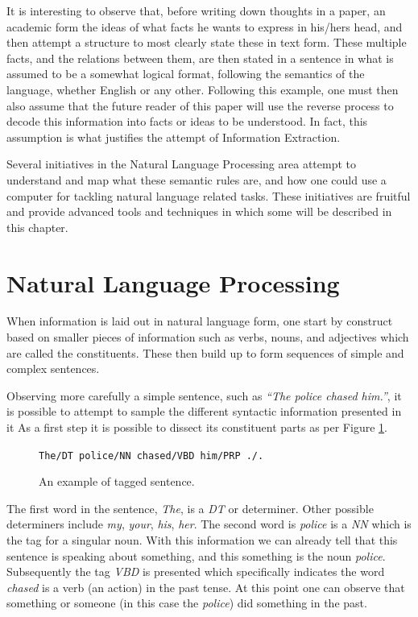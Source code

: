 \documentclass[11pt,a4paper,openright]{memoir}
\begin{document}
It is interesting to observe that, before writing down thoughts in a paper, an academic form the ideas of what facts he wants to express in his/hers head, and then attempt a structure to most clearly state these in text form. These multiple facts, and the relations between them, are then stated in a sentence in what is assumed to be a somewhat logical format, following the semantics of the language, whether English or any other. Following this example, one must then also assume that the future reader of this paper will use the reverse process to decode this information into facts or ideas to be understood. In fact, this assumption is what justifies the attempt of Information Extraction.

Several initiatives in the Natural Language Processing area attempt to understand and map what these semantic rules are, and how one could use a computer for tackling natural language related tasks. These initiatives are fruitful and provide advanced tools and techniques in which some will be described in this chapter.


%
%
%
%


\section{Natural Language Processing}

When information is laid out in natural language form, one start by construct based on smaller pieces of information such as verbs, nouns, and adjectives which are called the constituents. These then build up to form sequences of simple and complex sentences.

Observing more carefully a simple sentence, such as \emph{\enquote{The police chased him.}}, it is possible to attempt to sample the different syntactic information presented in it As a first step it is possible to dissect its constituent parts as per Figure \ref{fig:pos_tags}.

\begin{figure}[!htbp]
  \centering
    \texttt{The/DT police/NN chased/VBD him/PRP ./.}
  \caption[An example of tagged sentence.]{An example of tagged sentence.}
  \label{fig:pos_tags}
\end{figure}

The first word in the sentence, \emph{The}, is a \emph{DT} or determiner. Other possible determiners include \emph{my}, \emph{your}, \emph{his}, \emph{her}. The second word is \emph{police} is a \emph{NN} which is the tag for a singular noun. With this information we can already tell that this sentence is speaking about something, and this something is the noun \emph{police}. Subsequently the tag \emph{VBD} is presented which specifically indicates the word \emph{chased} is a verb (an action) in the past tense. At this point one can observe that something or someone (in this case the \emph{police}) did something in the past.
\end{document}
